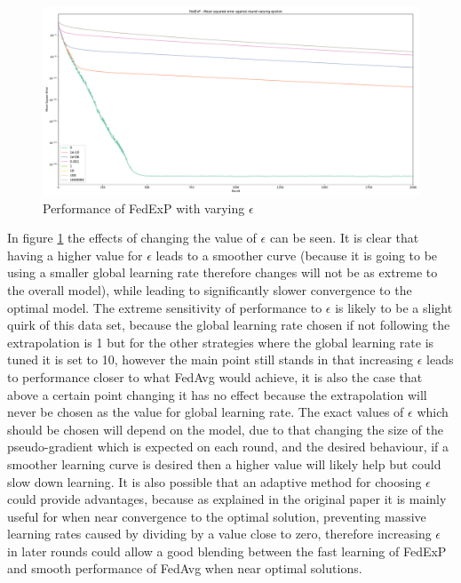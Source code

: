 \documentclass{article}
\begin{document}
\begin{figure}
    \centerline{\includegraphics[width=.85\linewidth]{figs/synthetic_varyingEpsilon.pdf}}
    \caption{Performance of FedExP with varying $\epsilon$}
    \label{fig:varyingEpsilon}
\end{figure}

In figure \ref{fig:varyingEpsilon} the effects of changing the value of $\epsilon$ can be seen.  It is clear that having a higher value for $\epsilon$ leads to a smoother curve (because it is going to be using a smaller global learning rate therefore changes will not be as extreme to the overall model), while leading to significantly slower convergence to the optimal model.  The extreme sensitivity of performance to $\epsilon$ is likely to be a slight quirk of this data set, because the global learning rate chosen if not following the extrapolation is 1 but for the other strategies where the global learning rate is tuned it is set to 10, however the main point still stands in that increasing $\epsilon$ leads to performance closer to what FedAvg would achieve, it is also the case that above a certain point changing it has no effect because the extrapolation will never be chosen as the value for global learning rate.  The exact values of $\epsilon$ which should be chosen will depend on the model, due to that changing the size of the pseudo-gradient which is expected on each round, and the desired behaviour, if a smoother learning curve is desired then a higher value will likely help but could slow down learning.  It is also possible that an adaptive method for choosing $\epsilon$ could provide advantages, because as explained in the original paper it is mainly useful for when near convergence to the optimal solution, preventing massive learning rates caused by dividing by a value close to zero, therefore increasing $\epsilon$ in later rounds could allow a good blending between the fast learning of FedExP and smooth performance of FedAvg when near optimal solutions.
\end{document}
